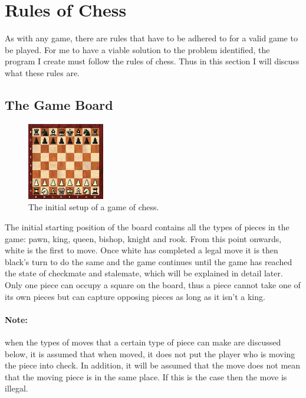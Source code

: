 \documentclass[twoside, 12pt]{report}
\begin{document}
\section{Rules of Chess}
As with any game, there are rules that have to be adhered to for a valid game to be played. For me to have a viable solution to the problem identified, the program I create must follow the rules of chess. Thus in this section I will discuss what these rules are.
\subsection{The Game Board}
\begin{figure}[H]
\centering
	\includegraphics[width=0.3\textwidth]{images/boards/initial_board}
	\caption{The initial setup of a game of chess.}
	\label{initial-board}
\end{figure}
The initial starting position of the board contains all the types of pieces in the game: pawn, king, queen, bishop, knight and rook. From this point onwards, white is the first to move. Once white has completed a legal move it is then black's turn to do the same and the game continues until the game has reached the state of checkmate and stalemate, which will be explained in detail later. Only one piece can occupy a square on the board, thus a piece cannot take one of its own pieces but can capture opposing pieces as long as it isn't a king.

\paragraph{Note:}when the types of moves that a certain type of piece can make are discussed below, it is assumed that when moved, it does not put the player who is moving the piece into check. In addition, it will be assumed that the move does not mean that the moving piece is in the same place. If this is the case then the move is illegal.
\end{document}
